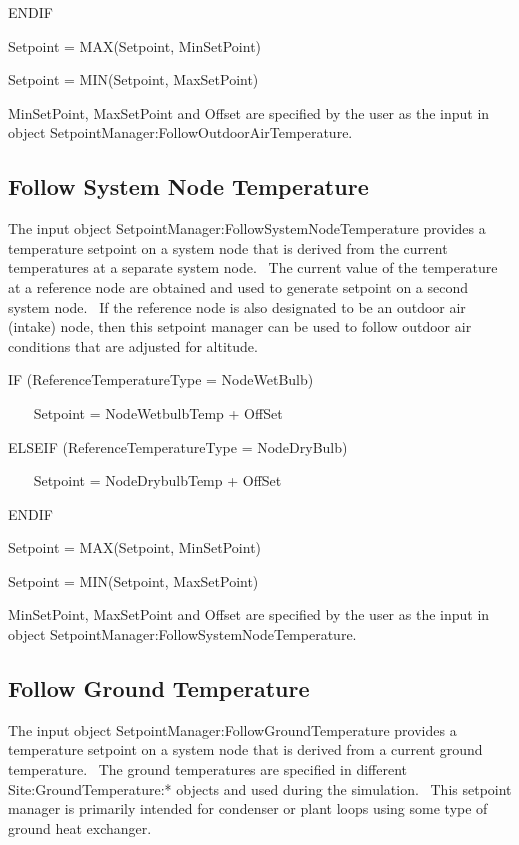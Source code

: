 ENDIF

Setpoint = MAX(Setpoint, MinSetPoint)

Setpoint = MIN(Setpoint, MaxSetPoint)

MinSetPoint, MaxSetPoint and Offset are specified by the user as the input in object SetpointManager:FollowOutdoorAirTemperature.

\subsection{Follow System Node Temperature}\label{follow-system-node-temperature}

The input object SetpointManager:FollowSystemNodeTemperature provides a temperature setpoint on a system node that is derived from the current temperatures at a separate system node.~ The current value of the temperature at a reference node are obtained and used to generate setpoint on a second system node.~ If the reference node is also designated to be an outdoor air (intake) node, then this setpoint manager can be used to follow outdoor air conditions that are adjusted for altitude.

IF (ReferenceTemperatureType = NodeWetBulb)

~~~ Setpoint = NodeWetbulbTemp + OffSet

ELSEIF (ReferenceTemperatureType = NodeDryBulb)

~~~ Setpoint = NodeDrybulbTemp + OffSet

ENDIF

Setpoint = MAX(Setpoint, MinSetPoint)

Setpoint = MIN(Setpoint, MaxSetPoint)

MinSetPoint, MaxSetPoint and Offset are specified by the user as the input in object SetpointManager:FollowSystemNodeTemperature.

\subsection{Follow Ground Temperature}\label{follow-ground-temperature}

The input object SetpointManager:FollowGroundTemperature provides a temperature setpoint on a system node that is derived from a current ground temperature.~ The ground temperatures are specified in different Site:GroundTemperature:* objects and used during the simulation.~ This setpoint manager is primarily intended for condenser or plant loops using some type of ground heat exchanger.

